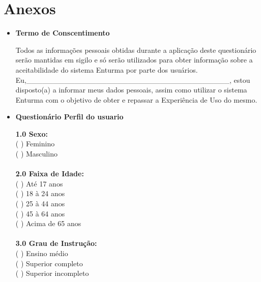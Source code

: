 \chapter*{Anexos}

\begin{itemize}

	\item \textbf{Termo de Conscentimento}

		Todos as informações pessoais obtidas durante a aplicação deste questionário serão mantidas em sigilo e só serão utilizados para obter informação sobre a aceitabilidade do sistema Enturma por parte dos usuários. \\
		Eu,\_\_\_\_\_\_\_\_\_\_\_\_\_\_\_\_\_\_\_\_\_\_\_\_\_\_\_\_\_\_\_\_\_\_\_\_\_\_, estou disposto(a) a informar meus dados pessoais, assim como utilizar o sistema Enturma com o objetivo de obter e repassar a Experiência de Uso do mesmo.



	\item \textbf{Questionário Perfil do usuario}


		\textbf{1.0 Sexo:}
			\\
			  ( ) Feminino \\
			  ( ) Masculino\\
			\\
		\textbf{2.0 Faixa de Idade:}
			\\
			  ( ) Até 17 anos\\
			  ( ) 18 à 24 anos\\
			  ( ) 25 à 44 anos\\
			  ( ) 45 à 64 anos\\
			  ( ) Acima de 65 anos\\
			\\
		\textbf{3.0 Grau de Instrução:}
			\\
			  ( ) Ensino médio\\
			  ( ) Superior completo\\
			  ( ) Superior incompleto\\
			\\


\end{itemize}
